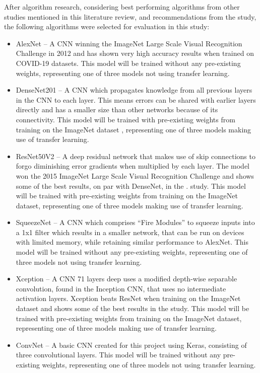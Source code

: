 After algorithm research, considering best performing algorithms from other studies mentioned in this literature review, and recommendations from the \cite{roberts2021common} study, the following algorithms were selected for evaluation in this study:
\begin{itemize}
    \item AlexNet \citep{krizhevsky2012imagenet} – A CNN winning the ImageNet Large Scale Visual Recognition Challenge in 2012 and has shown very high accuracy results when trained on COVID-19 datasets. This model will be trained without any pre-existing weights, representing one of three models not using transfer learning.
    
    \item DenseNet201 \citep{huang2017densely} – A CNN which propagates knowledge from all previous layers in the CNN to each layer. This means errors can be shared with earlier layers directly and has a smaller size than other networks because of its connectivity. This model will be trained with pre-existing weights from training on the ImageNet dataset \citep{deng2009imagenet}, representing one of three models making use of transfer learning.
    
    \item ResNet50V2 \citep{he2016identity} – A deep residual network that makes use of skip connections to forgo diminishing error gradients when multiplied by each layer. The model won the 2015 ImageNet Large Scale Visual Recognition Challenge and shows some of the best results, on par with DenseNet, in the \cite{bressem2020comparing}. study. This model will be trained with pre-existing weights from training on the ImageNet dataset, representing one of three models making use of transfer learning.
    
    \item SqueezeNet \citep{iandola2016squeezenet} – A CNN which comprises “Fire Modules” to squeeze inputs into a 1x1 filter which results in a smaller network, that can be run on devices with limited memory, while retaining similar performance to AlexNet. This model will be trained without any pre-existing weights, representing one of three models not using transfer learning.
    
    \item Xception \citep{chollet2017xception} – A CNN 71 layers deep uses a modified depth-wise separable convolution, found in the Inception CNN, that uses no intermediate activation layers. Xception beats ResNet when training on the ImageNet dataset and shows some of the best results in the \cite{bressem2020comparing} study. This model will be trained with pre-existing weights from training on the ImageNet dataset, representing one of three models making use of transfer learning.
    
    \item ConvNet – A basic CNN created for this project using Keras, consisting of three convolutional layers. This model will be trained without any pre-existing weights, representing one of three models not using transfer learning.
\end{itemize}
